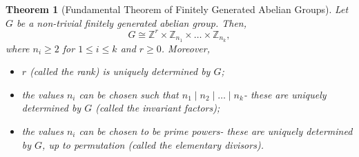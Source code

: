 \documentclass[a4paper, openany]{memoir}
\theoremstyle{definition}
\theoremstyle{plain}
\newtheorem{theorem}[definition]{Theorem}
\begin{document}
    \begin{theorem}[Fundamental Theorem of Finitely Generated Abelian Groups]
        Let $G$ be a non-trivial finitely generated abelian group. Then, 
        \[G \cong \mathbb{Z}^r \times \mathbb{Z}_{n_1} \times \dots \times \mathbb{Z}_{n_k},\]
        where $n_i \geq 2$ for $1 \leq i \leq k$ and $r \geq 0$. Moreover,
        \begin{itemize}
            \item $r$ (called the \emph{rank}) is uniquely determined by $G$;
            \item the values $n_i$ can be chosen such that $n_1 \mid n_2 \mid \dots \mid n_k$- these are uniquely determined by $G$ (called the \emph{invariant factors});
            \item the values $n_i$ can be chosen to be prime powers- these are uniquely determined by $G$, up to permutation (called the \emph{elementary divisors}).
        \end{itemize}
    \end{theorem}
\end{document}
